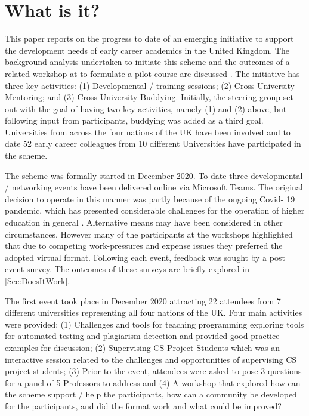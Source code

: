 \documentclass[sigconf]{acmart}
\begin{document}
\section{What is it?}	
\label{sec:What}
This paper reports on the progress to date of an emerging initiative to support the development needs of early career academics in the United Kingdom. The background analysis undertaken to initiate this scheme and the outcomes of a related workshop at  to formulate a pilot course are discussed . The initiative has three key activities: (1) Developmental / training sessions; (2) Cross-University Mentoring; and (3) Cross-University Buddying. Initially, the steering group set out with the goal of having two key activities, namely (1) and (2) above, but following input from participants, buddying was added as a third goal. Universities from across the four nations of the UK have been involved and to date 52 early career colleagues from 10 different Universities have participated in the scheme. 

The scheme was formally started in December 2020. To date three developmental / networking events have been delivered online via Microsoft Teams. The original decision to operate in this manner was partly because of the ongoing Covid- 19 pandemic, which has presented considerable challenges for the operation of higher education in general \cite{CrickCovidUK}. Alternative means may have been considered in other circumstances. However many of the participants at the workshops highlighted that due to competing work-pressures and expense issues they preferred the adopted virtual format. Following each event, feedback was sought by a post event survey. The outcomes of these surveys are briefly explored in \ref{Sec:DoesItWork}. 

The first event took place in December 2020 attracting 22 attendees from 7 different universities representing all four nations of the UK. Four main activities were provided: (1) Challenges and tools for teaching programming exploring tools for automated testing and plagiarism detection and provided good practice examples for discussion; (2) Supervising CS Project Students which was an interactive session related to the challenges and opportunities of supervising CS project students; (3) Prior to the event, attendees were asked to pose 3 questions for a panel of 5 Professors to address and (4) A workshop that explored how can the scheme support / help the participants, how can a community be developed for the participants, and did the format work and what could be improved?
\end{document}
